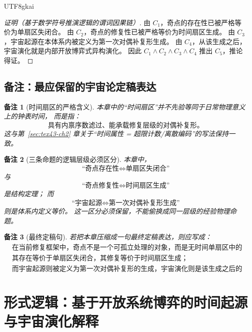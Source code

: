 \documentclass[12pt]{article}
\newtheorem{remark}{备注}[section]
\begin{document}
\begin{CJK*}{UTF8}{gkai}
\begin{proof}[证明（基于数学符号推演逻辑的谓词因果链）]
由 $C_1$，奇点的存在性已被严格等价为单扇区失闭合。
由 $C_2$，奇点的修复性已被严格等价为时间扇区生成。
由 $C_3$，宇宙起源在本体系内被定义为第一次对偶补复形生成。
由 $C_4$，从该生成之后，宇宙演化就是内部开放博弈式异构演化。
因此 $C_1\wedge C_2\wedge C_3\wedge C_4$ 推出 $C_5$，推论得证。
\end{proof}

\subsection{备注：最应保留的宇宙论定稿表达}
\label{subsec:tex43-ch9-remarks}

\begin{remark}[时间扇区的严格含义]
本章中的“时间扇区”并不先验等同于日常物理意义上的钟表时间，
而是指：
\[
  \boxed{
    \text{具有内禀序数滤过、能承载修复层级的对偶补复形。}
  }
\]
这与第~\ref{sec:tex43-ch2} 章关于“时间属性 = 超限计数/离散编码”的写法保持一致。
\end{remark}

\begin{remark}[三条命题的逻辑层级必须区分]
本章中，
\[
  \text{“奇点存在性}\iff\text{单扇区失闭合”}
\]
与
\[
  \text{“奇点修复性}\iff\text{时间扇区生成”}
\]
是结构定理；
而
\[
  \text{“宇宙起源}\iff\text{第一次对偶补复形生成”}
\]
则是体系内定义等价。
这一区分必须保留，不能偷换成同一层级的经验物理命题。
\end{remark}

\begin{remark}[最终定稿句]
若把本章压缩成一句最终定稿表达，则应写成：
\[
  \boxed{
    \begin{aligned}
      &\text{在当前修复框架中，奇点不是一个可孤立处理的对象，而是无时间单扇区中的失闭合局域；}\\
      &\text{其存在等价于单扇区失闭合，其修复等价于时间扇区生成；}\\
      &\text{而宇宙起源则被定义为第一次对偶补复形的生成，宇宙演化则是该生成之后的内部开放博弈式异构演化。}
    \end{aligned}
  }
\]
\end{remark}

\clearpage

\section{形式逻辑：基于开放系统博弈的时间起源与宇宙演化解释}
\label{sec:tex43-ch10}


\end{CJK*}
\end{document}
